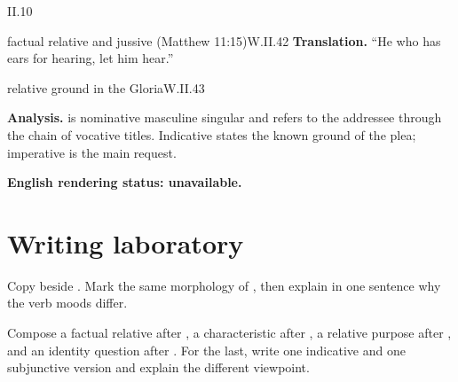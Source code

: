 \begin{courseunit}{II.10}
\begin{workedexample}{factual relative and jussive (Matthew 11:15)}{W.II.42}
\textbf{Translation.}  ``He who has ears for hearing, let him hear.''
\end{workedexample}

\begin{workedexample}{relative ground in the Gloria}{W.II.43}

\textbf{Analysis.}   is nominative masculine singular and refers to the addressee
through the chain of vocative titles.  Indicative  states the known ground of
the plea; imperative  is the main request.

\textbf{English rendering status: unavailable.}
\end{workedexample}

\section{Writing laboratory}

Copy  beside .  Mark the
same morphology of , then explain in one sentence why the verb moods differ.

Compose a factual relative after , a characteristic after , a
relative purpose after , and an identity question after .
For the last, write one indicative and one subjunctive version and explain the different
viewpoint.



\end{courseunit}

